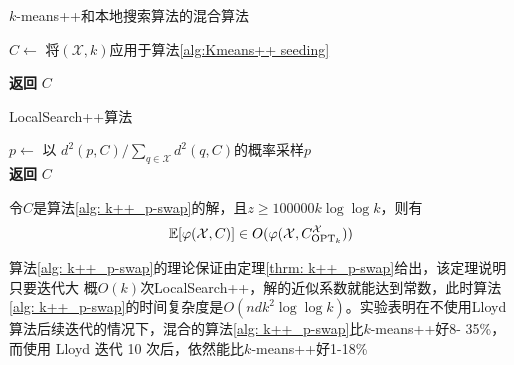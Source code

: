 \begin{algorithm}[H]
    \caption{$k$-means++和本地搜索算法的混合算法}\label{alg: k++_p-swap}
    $C \gets $ 将$(\mathcal{X},k)$应用于算法\ref{alg:Kmeans++ seeding} \\
    
    \textbf{返回} $C$
\end{algorithm}
\begin{algorithm}[H]
    \caption{LocalSearch++算法}\label{alg: local_search++}
    $p \gets$ 以 $d^2 (p,C)/ \sum_{q \in \mathcal{X}}d^2 (q,C)$的概率采样$p$ \\
    \textbf{返回} $C$
\end{algorithm}
\begin{theorem}
    \label{thrm: k++_p-swap}
     令$C$是算法\ref{alg: k++_p-swap}的解，且$z \geq 100000 k \log\log k$，则有
     \begin{equation*}
         \mathbb{E}[\varphi(\mathcal{X},C)] \in O(\varphi(\mathcal{X},C_{\text{OPT}_k}^{\mathcal{X}}))
     \end{equation*}
\end{theorem}
算法\ref{alg: k++_p-swap}的理论保证由定理\ref{thrm: k++_p-swap}给出，该定理说明只要迭代大
概$O(k)$次LocalSearch++，解的近似系数就能达到常数，此时算法\ref{alg: k++_p-swap}的时间复杂度是$O(ndk^2 \log\log k)$。实验表明在不使用Lloyd 算法后续迭代的情况下，混合的算法\ref{alg: k++_p-swap}比$k$-means++好8-
35\%，而使用 Lloyd 迭代 10 次后，依然能比$k$-means++好1-18\%

